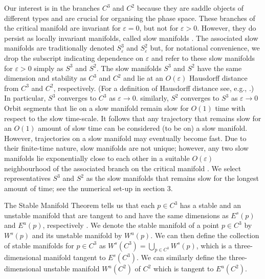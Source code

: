 \documentclass{ws-ijbc}
\begin{document}
Our interest is in the branches $C^3$ and $C^2$ because they are saddle objects of different types and are crucial for organising the phase space.  These branches of the critical manifold are invariant for $\varepsilon = 0$, but not for $\varepsilon > 0$.  However, they do persist as locally invariant manifolds, called slow manifolds \cite{Fenichel}.  The associated slow manifolds are traditionally denoted $S^3_\varepsilon$ and $S^2_\varepsilon$ but, for notational convenience, we drop the subscript indicating dependence on $\varepsilon$ and refer to these slow manifolds for $\varepsilon > 0$ simply as $S^3$ and $S^2$.  The slow manifolds $S^3$ and $S^2$ have the same dimension and stability as $C^3$ and $C^2$ and lie at an $O(\varepsilon)$ Hausdorff distance from $C^3$ and $C^2$, respectively.  (For a definition of Hausdorff distance see, e.g., \cite{Hausdorff_Distance}.)  In particular, $S^3$ converges to $C^3$ as $\varepsilon \rightarrow 0$.  similarly, $S^2$ converges to $S^3$ as $\varepsilon \rightarrow 0$  Orbit segments that lie on a slow manifold remain slow for $O(1)$ time with respect to the slow time-scale.  It follows that any trajectory that remains slow for an $O(1)$ amount of slow time can be considered (to be on) a slow manifold.  However, trajectories on a slow manifold may eventually become fast. Due to their finite-time nature, slow manifolds are not unique; however, any two slow manifolds lie exponentially close to each other in a suitable $O(\varepsilon)$ neighbourhood of the associated branch on the critical manifold \cite{Fenichel}.  We select representatives $S^3$ and $S^2$ as the slow manifolds that remains slow for the longest amount of time; see the numerical set-up in section 3.

The Stable Manifold Theorem tells us that each $p \in C^3$ has a stable and an unstable manifold that are tangent to and have the same dimensions as $E^{s}(p)$ and $E^{u}(p)$, respectively \cite{Perko_book}.  We denote the stable manifold of a point $p \in C^3$ by $W^{s}(p)$ and its unstable manifold by $W^{u}(p)$.  We can then define the collection of stable manifolds for $p \in C^3$ as $W^{s}(C^3) = \bigcup_{p \in C^3} W^{s}(p)$, which is a three-dimensional manifold tangent to $E^s(C^3)$.  We can similarly define the three-dimensional unstable manifold $W^{u}(C^2)$ of $C^2$ which is tangent to $E^u(C^2)$.
\end{document}
